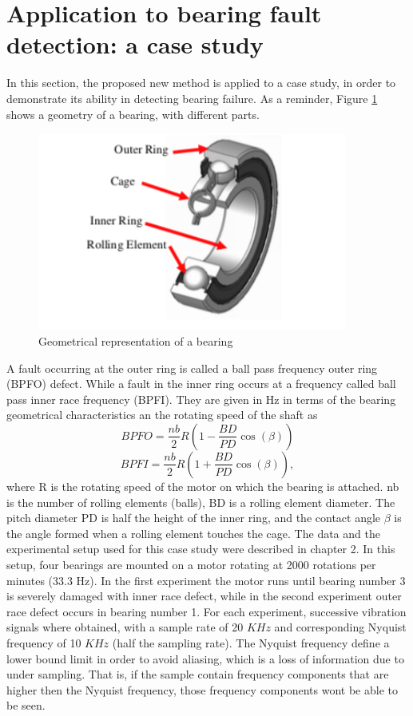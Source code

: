 \documentclass[../Main/thesis.tex]{subfiles}
\begin{document}
\section{Application to bearing fault detection: a case study}
\label{sec:pulse}
In this section, the proposed new method is applied to a case study, in order to demonstrate its ability in detecting bearing failure. As a reminder, Figure \ref{fig:bearing-architecture} shows a geometry of a bearing, with different parts.
\begin{figure}[H] %
   \centering
   \includegraphics[width=4in]{../fig/bearing.png} 
   \caption{Geometrical representation of a bearing}
   \label{fig:bearing-architecture}
\end{figure}
\justify
A fault occurring at the outer ring is called a ball pass frequency outer ring (BPFO) defect. While a fault in the inner ring occurs at a frequency called ball pass inner race frequency (BPFI). They are given in Hz in terms of the bearing geometrical characteristics an the rotating speed of the shaft as
\begin{equation}\label{eq:bpfo2}
BPFO = \frac{nb}{2}R\left(1-\frac{BD}{PD}\cos\left(\beta\right)  \right) \nonumber
\end{equation}
\begin{equation}\label{eq:bpfi2}
BPFI = \frac{nb}{2}R\left( 1 +  \frac{BD}{PD}\cos\left(\beta\right)   \right),
\end{equation}
where R is the rotating speed of the motor on which the bearing is attached. nb is the number of rolling elements (balls), BD is a rolling element diameter. The pitch diameter PD is half the height of the inner ring, and the contact angle $\beta$ is the angle formed when a rolling element touches the cage. 
\justify
The data and the experimental setup used for this case study were described in chapter 2. In this setup, four bearings are mounted on a motor rotating at 2000 rotations per minutes (33.3 Hz). In the first experiment the motor runs until
bearing number 3 is severely damaged with inner race defect, while in the second experiment outer race defect occurs in bearing number 1. For each experiment, successive vibration signals where obtained, with a sample rate of 20 $KHz$ and corresponding Nyquist frequency of 10 $KHz$ (half the sampling rate). The Nyquist frequency define a lower bound limit in order to avoid aliasing, which is a loss of information due to under sampling. That is, if the sample contain frequency components that are higher then the Nyquist frequency, those frequency components wont be able to be seen.
\end{document}
